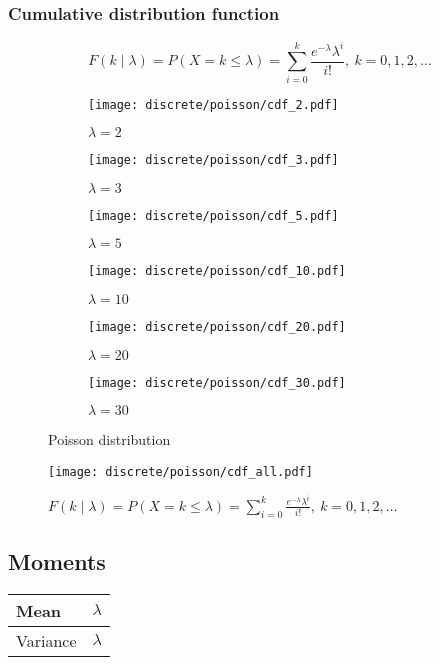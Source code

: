 \subsubsection{Cumulative distribution function}
\[
	F(k \mid \lambda) = P(X = k \leq \lambda) = \sum_{i = 0}^{k} \frac{e^{-\lambda} \lambda^i}{i!}, \ k = 0, 1, 2, \ldots
\]

\begin{figure}[H]
	\centering
	\begin{subfigure}[b]{0.45\textwidth}
		\texttt{[image: discrete/poisson/cdf\_2.pdf]}
		\caption{$\lambda = 2$}
	\end{subfigure}
	\begin{subfigure}[b]{0.45\textwidth}
		\texttt{[image: discrete/poisson/cdf\_3.pdf]}
		\caption{$\lambda = 3$}
	\end{subfigure}
	\begin{subfigure}[b]{0.45\textwidth}
		\texttt{[image: discrete/poisson/cdf\_5.pdf]}
		\caption{$\lambda = 5$}
	\end{subfigure}
	\begin{subfigure}[b]{0.45\textwidth}
		\texttt{[image: discrete/poisson/cdf\_10.pdf]}
		\caption{$\lambda = 10$}
	\end{subfigure}
	\begin{subfigure}[b]{0.45\textwidth}
		\texttt{[image: discrete/poisson/cdf\_20.pdf]}
		\caption{$\lambda = 20$}
	\end{subfigure}
	\begin{subfigure}[b]{0.45\textwidth}
		\texttt{[image: discrete/poisson/cdf\_30.pdf]}
		\caption{$\lambda = 30$}
	\end{subfigure}
	\caption{Poisson distribution}
\end{figure}

\begin{figure}[H]
	\texttt{[image: discrete/poisson/cdf\_all.pdf]}
	\caption{$F(k \mid \lambda) = P(X = k \leq \lambda) = \sum_{i = 0}^{k} \frac{e^{-\lambda} \lambda^i}{i!}, \ k = 0, 1, 2, \ldots$}
\end{figure}

\subsection{Moments}

\begin{tabularx}{\textwidth}{s X}
	\hline
	Mean & $\lambda$ \\\hline
	Variance & $\lambda$\\\hline
\end{tabularx}

